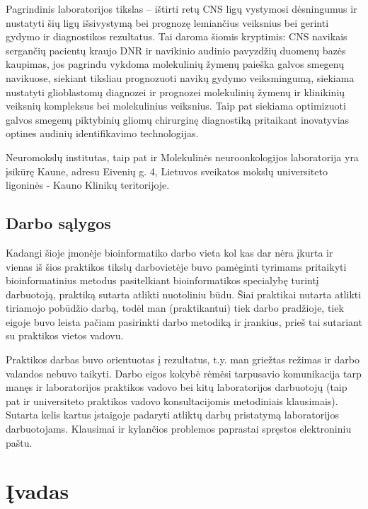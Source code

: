 \documentclass[a4paper,12pt]{article}
\begin{document}
Pagrindinis laboratorijos tikslas – ištirti retų CNS ligų vystymosi dėsningumus ir nustatyti šių ligų išsivystymą bei prognozę lemiančius veiksnius bei gerinti gydymo ir diagnostikos rezultatus. Tai daroma šiomis kryptimis: CNS navikais sergančių pacientų kraujo DNR ir navikinio audinio pavyzdžių duomenų bazės kaupimas, jos pagrindu vykdoma molekulinių žymenų paieška galvos smegenų navikuose, siekiant tiksliau prognozuoti navikų gydymo veiksmingumą, siekiama nustatyti glioblastomų diagnozei ir prognozei molekulinių žymenų ir klinikinių veiksnių kompleksus bei molekulinius veiksnius. Taip pat siekiama optimizuoti galvos smegenų piktybinių gliomų chirurginę diagnostiką pritaikant inovatyvias optines audinių identifikavimo technologijas\cite{molneurolab}.

Neuromokslų institutas, taip pat ir Molekulinės neuroonkologijos laboratorija yra įsikūrę Kaune, adresu Eivenių g. 4, Lietuvos sveikatos mokslų universiteto ligoninės - Kauno Klinikų teritorijoje.

\subsection{Darbo sąlygos}
\indent\indent
Kadangi šioje įmonėje bioinformatiko darbo vieta kol kas dar nėra įkurta ir vienas iš šios praktikos tikslų darbovietėje buvo pamėginti tyrimams pritaikyti bioinformatinius metodus pasitelkiant bioinformatikos specialybę turintį darbuotoją, praktiką sutarta atlikti nuotoliniu būdu. Šiai praktikai nutarta atlikti tiriamojo pobūdžio darbą, todėl man (praktikantui) tiek darbo pradžioje, tiek eigoje buvo leista pačiam pasirinkti darbo metodiką ir įrankius, prieš tai sutariant su praktikos vietos vadovu.

Praktikos darbas buvo orientuotas į rezultatus, t.y. man griežtas režimas ir darbo valandos nebuvo taikyti. Darbo eigos kokybė rėmėsi tarpusavio komunikacija tarp manęs ir laboratorijos praktikos vadovo bei kitų laboratorijos darbuotojų (taip pat ir universiteto praktikos vadovo konsultacijomis metodiniais klausimais). Sutarta kelis kartus įstaigoje padaryti atliktų darbų pristatymą laboratorijos darbuotojams. Klausimai ir kylančios problemos paprastai spręstos elektroniniu paštu.

\section{Įvadas}
\end{document}
